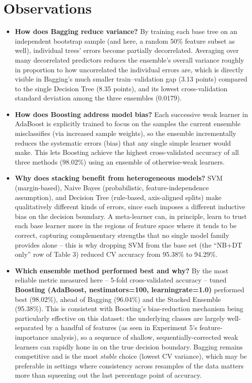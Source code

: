 \documentclass[12pt,a4paper]{article}
\DeclareRobustCommand{\_}{\textunderscore\allowbreak}
\begin{document}
\section{Observations}
\begin{itemize}
\item \textbf{How does Bagging reduce variance?} By training each base
tree on an independent bootstrap sample (and here, a random 50\% feature
subset as well), individual trees' errors become partially decorrelated.
Averaging over many decorrelated predictors reduces the ensemble's overall
variance roughly in proportion to how uncorrelated the individual errors
are, which is directly visible in Bagging's much smaller train--validation
gap (3.13 points) compared to the single Decision Tree (8.35 points), and
its lowest cross-validation standard deviation among the three ensembles
(0.0179).
\item \textbf{How does Boosting address model bias?} Each successive weak
learner in AdaBoost is explicitly trained to focus on the samples the
current ensemble misclassifies (via increased sample weights), so the
ensemble incrementally reduces the systematic errors (bias) that any single
simple learner would make. This lets Boosting achieve the highest
cross-validated accuracy of all three methods (98.02\%) using an ensemble
of otherwise-weak learners.
\item \textbf{Why does stacking benefit from heterogeneous models?} SVM
(margin-based), Naive Bayes (probabilistic, feature-independence
assumption), and Decision Tree (rule-based, axis-aligned splits) make
qualitatively different kinds of errors, since each imposes a different
inductive bias on the decision boundary. A meta-learner can, in principle,
learn to trust each base learner more in the regions of feature space where
it tends to be correct, capturing complementary strengths that no single
model family provides alone -- this is why dropping SVM from the base set
(the ``NB+DT only'' row of Table 3) reduced CV accuracy from 95.38\% to
94.29\%.
\item \textbf{Which ensemble method performed best and why?} By the most
reliable metric measured here -- 5-fold cross-validated accuracy -- tuned
\textbf{Boosting (AdaBoost, n\_estimators=100, learning\_rate=1.0)}
performed best (98.02\%), ahead of Bagging (96.04\%) and the Stacked
Ensemble (95.38\%). This is consistent with Boosting's bias-reduction
mechanism being particularly effective on this dataset: the underlying
classes are largely well-separated by a handful of features (as seen in
Experiment 5's feature-importance analysis), so a sequence of shallow,
sequentially-corrected weak learners can rapidly hone in on the true
decision boundary. Bagging remains competitive and is the most
\emph{stable} choice (lowest CV variance), which may be preferable in
settings where consistency across resamples of the data matters more than
squeezing out the last percentage point of accuracy.
\end{itemize}
\end{document}
